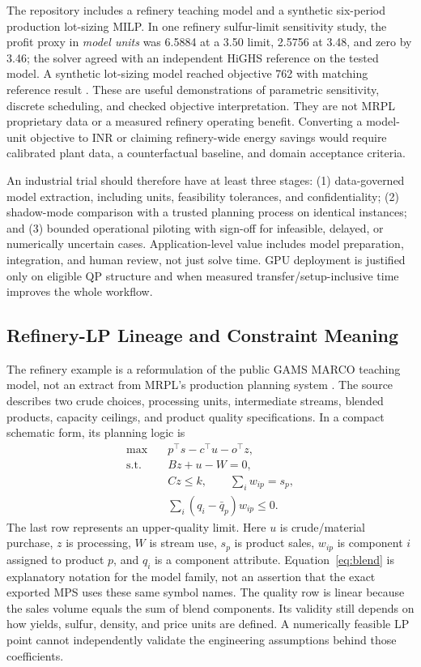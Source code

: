 \documentclass[10pt,a4paper,twocolumn]{article}
\begin{document}
The repository includes a refinery teaching model and a synthetic six-period production lot-sizing MILP. In one refinery sulfur-limit sensitivity study, the profit proxy in \emph{model units} was 6.5884 at a 3.50 limit, 2.5756 at 3.48, and zero by 3.46; the solver agreed with an independent HiGHS reference on the tested model. A synthetic lot-sizing model reached objective 762 with matching reference result \cite{demo,industrial}. These are useful demonstrations of parametric sensitivity, discrete scheduling, and checked objective interpretation. They are not MRPL proprietary data or a measured refinery operating benefit. Converting a model-unit objective to INR or claiming refinery-wide energy savings would require calibrated plant data, a counterfactual baseline, and domain acceptance criteria.

An industrial trial should therefore have at least three stages: (1) data-governed model extraction, including units, feasibility tolerances, and confidentiality; (2) shadow-mode comparison with a trusted planning process on identical instances; and (3) bounded operational piloting with sign-off for infeasible, delayed, or numerically uncertain cases. Application-level value includes model preparation, integration, and human review, not just solve time. GPU deployment is justified only on eligible QP structure and when measured transfer/setup-inclusive time improves the whole workflow.

\subsection{Refinery-LP Lineage and Constraint Meaning}

The refinery example is a reformulation of the public GAMS MARCO teaching model, not an extract from MRPL's production planning system \cite{gamsmarco,industrial}. The source describes two crude choices, processing units, intermediate streams, blended products, capacity ceilings, and product quality specifications. In a compact schematic form, its planning logic is
\begin{align}
\max\quad & p^\top s-c^\top u-o^\top z,\\
\text{s.t.}\quad & Bz+u-W=0,\\
& Cz\leq k,\qquad \sum_i w_{ip}=s_p,\\
& \sum_i (q_i-\bar q_p)w_{ip}\leq 0.
\label{eq:blend}
\end{align}
The last row represents an upper-quality limit. Here $u$ is crude/material purchase, $z$ is processing, $W$ is stream use, $s_p$ is product sales, $w_{ip}$ is component $i$ assigned to product $p$, and $q_i$ is a component attribute. Equation~\eqref{eq:blend} is explanatory notation for the model family, not an assertion that the exact exported MPS uses these same symbol names. The quality row is linear because the sales volume equals the sum of blend components. Its validity still depends on how yields, sulfur, density, and price units are defined. A numerically feasible LP point cannot independently validate the engineering assumptions behind those coefficients.
\end{document}
